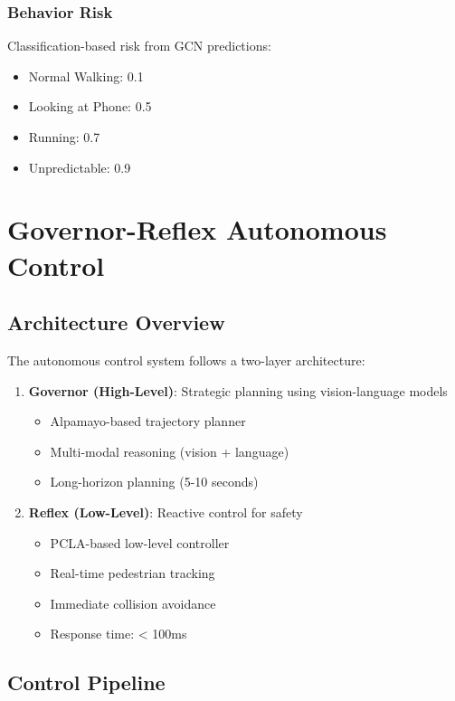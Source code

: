 \documentclass[11pt,a4paper]{article}
\begin{document}
\subsubsection{Behavior Risk}

Classification-based risk from GCN predictions:
\begin{itemize}
    \item Normal Walking: 0.1
    \item Looking at Phone: 0.5
    \item Running: 0.7
    \item Unpredictable: 0.9
\end{itemize}

\section{Governor-Reflex Autonomous Control}

\subsection{Architecture Overview}

The autonomous control system follows a two-layer architecture:

\begin{enumerate}
    \item \textbf{Governor (High-Level)}: Strategic planning using vision-language models
    \begin{itemize}
        \item Alpamayo-based trajectory planner
        \item Multi-modal reasoning (vision + language)
        \item Long-horizon planning (5-10 seconds)
    \end{itemize}
    
    \item \textbf{Reflex (Low-Level)}: Reactive control for safety
    \begin{itemize}
        \item PCLA-based low-level controller
        \item Real-time pedestrian tracking
        \item Immediate collision avoidance
        \item Response time: < 100ms
    \end{itemize}
\end{enumerate}

\subsection{Control Pipeline}
\end{document}
